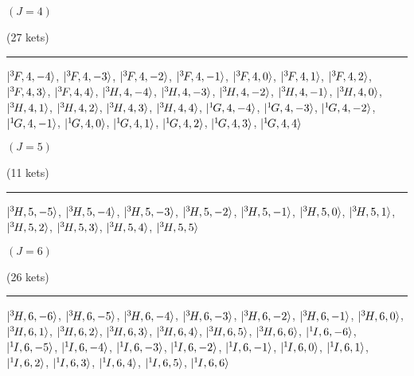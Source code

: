 \begin{mdframed}
\begin{center}
$(J=4)$

(27 kets)
\vspace{0.25cm}
\hrule
\vspace{0.25cm}
$|{}^{3}{\kern-0.1em}{F},4,-4\rangle$, $|{}^{3}{\kern-0.1em}{F},4,-3\rangle$, $|{}^{3}{\kern-0.1em}{F},4,-2\rangle$, $|{}^{3}{\kern-0.1em}{F},4,-1\rangle$, $|{}^{3}{\kern-0.1em}{F},4,0\rangle$, $|{}^{3}{\kern-0.1em}{F},4,1\rangle$, $|{}^{3}{\kern-0.1em}{F},4,2\rangle$, $|{}^{3}{\kern-0.1em}{F},4,3\rangle$, $|{}^{3}{\kern-0.1em}{F},4,4\rangle$, $|{}^{3}{\kern-0.1em}{H},4,-4\rangle$, $|{}^{3}{\kern-0.1em}{H},4,-3\rangle$, $|{}^{3}{\kern-0.1em}{H},4,-2\rangle$, $|{}^{3}{\kern-0.1em}{H},4,-1\rangle$, $|{}^{3}{\kern-0.1em}{H},4,0\rangle$, $|{}^{3}{\kern-0.1em}{H},4,1\rangle$, $|{}^{3}{\kern-0.1em}{H},4,2\rangle$, $|{}^{3}{\kern-0.1em}{H},4,3\rangle$, $|{}^{3}{\kern-0.1em}{H},4,4\rangle$, $|{}^{1}{\kern-0.1em}{G},4,-4\rangle$, $|{}^{1}{\kern-0.1em}{G},4,-3\rangle$, $|{}^{1}{\kern-0.1em}{G},4,-2\rangle$, $|{}^{1}{\kern-0.1em}{G},4,-1\rangle$, $|{}^{1}{\kern-0.1em}{G},4,0\rangle$, $|{}^{1}{\kern-0.1em}{G},4,1\rangle$, $|{}^{1}{\kern-0.1em}{G},4,2\rangle$, $|{}^{1}{\kern-0.1em}{G},4,3\rangle$, $|{}^{1}{\kern-0.1em}{G},4,4\rangle$
\end{center}
\end{mdframed}

\begin{mdframed}
\begin{center}
$(J=5)$

(11 kets)
\vspace{0.25cm}
\hrule
\vspace{0.25cm}
$|{}^{3}{\kern-0.1em}{H},5,-5\rangle$, $|{}^{3}{\kern-0.1em}{H},5,-4\rangle$, $|{}^{3}{\kern-0.1em}{H},5,-3\rangle$, $|{}^{3}{\kern-0.1em}{H},5,-2\rangle$, $|{}^{3}{\kern-0.1em}{H},5,-1\rangle$, $|{}^{3}{\kern-0.1em}{H},5,0\rangle$, $|{}^{3}{\kern-0.1em}{H},5,1\rangle$, $|{}^{3}{\kern-0.1em}{H},5,2\rangle$, $|{}^{3}{\kern-0.1em}{H},5,3\rangle$, $|{}^{3}{\kern-0.1em}{H},5,4\rangle$, $|{}^{3}{\kern-0.1em}{H},5,5\rangle$
\end{center}
\end{mdframed}

\begin{mdframed}
\begin{center}
$(J=6)$

(26 kets)
\vspace{0.25cm}
\hrule
\vspace{0.25cm}
$|{}^{3}{\kern-0.1em}{H},6,-6\rangle$, $|{}^{3}{\kern-0.1em}{H},6,-5\rangle$, $|{}^{3}{\kern-0.1em}{H},6,-4\rangle$, $|{}^{3}{\kern-0.1em}{H},6,-3\rangle$, $|{}^{3}{\kern-0.1em}{H},6,-2\rangle$, $|{}^{3}{\kern-0.1em}{H},6,-1\rangle$, $|{}^{3}{\kern-0.1em}{H},6,0\rangle$, $|{}^{3}{\kern-0.1em}{H},6,1\rangle$, $|{}^{3}{\kern-0.1em}{H},6,2\rangle$, $|{}^{3}{\kern-0.1em}{H},6,3\rangle$, $|{}^{3}{\kern-0.1em}{H},6,4\rangle$, $|{}^{3}{\kern-0.1em}{H},6,5\rangle$, $|{}^{3}{\kern-0.1em}{H},6,6\rangle$, $|{}^{1}{\kern-0.1em}{I},6,-6\rangle$, $|{}^{1}{\kern-0.1em}{I},6,-5\rangle$, $|{}^{1}{\kern-0.1em}{I},6,-4\rangle$, $|{}^{1}{\kern-0.1em}{I},6,-3\rangle$, $|{}^{1}{\kern-0.1em}{I},6,-2\rangle$, $|{}^{1}{\kern-0.1em}{I},6,-1\rangle$, $|{}^{1}{\kern-0.1em}{I},6,0\rangle$, $|{}^{1}{\kern-0.1em}{I},6,1\rangle$, $|{}^{1}{\kern-0.1em}{I},6,2\rangle$, $|{}^{1}{\kern-0.1em}{I},6,3\rangle$, $|{}^{1}{\kern-0.1em}{I},6,4\rangle$, $|{}^{1}{\kern-0.1em}{I},6,5\rangle$, $|{}^{1}{\kern-0.1em}{I},6,6\rangle$
\end{center}
\end{mdframed}